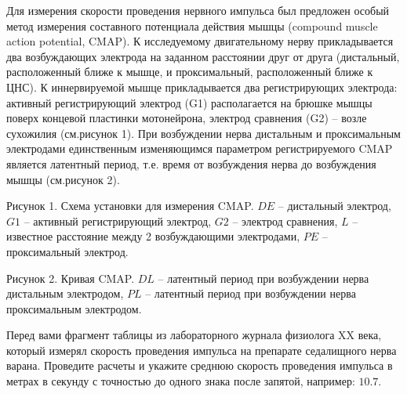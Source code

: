 
Для
измерения скорости проведения нервного импульса был предложен особый метод
измерения составного потенциала действия мышцы (compound muscle action
potential, CMAP). К исследуемому
двигательному нерву прикладывается два возбуждающих электрода на заданном
расстоянии друг от друга (дистальный,
расположенный ближе к мышце, и проксимальный,
расположенный ближе к ЦНС). К иннервируемой мышце прикладывается два
регистрирующих электрода: активный
регистрирующий электрод (G1) располагается на брюшке мышцы поверх концевой
пластинки мотонейрона, электрод
сравнения (G2) – возле сухожилия (см.рисунок 1). При возбуждении нерва
дистальным и проксимальным электродами единственным изменяющимся параметром
регистрируемого CMAP является латентный период, т.е. время от возбуждения нерва
до возбуждения мышцы (см.рисунок 2).


Рисунок
1. Схема установки для измерения CMAP. $DE$ – дистальный электрод, $G1$ – активный
регистрирующий электрод, $G2$ – электрод сравнения, $L$ – известное расстояние
между 2 возбуждающими электродами, $PE$ – проксимальный электрод.


Рисунок
2. Кривая CMAP. $DL$  – латентный период при возбуждении нерва дистальным электродом,
$PL$  – латентный период при возбуждении нерва проксимальным электродом.

Перед вами фрагмент таблицы из лабораторного
журнала физиолога XX века, который измерял скорость проведения импульса на
препарате седалищного нерва варана. Проведите расчеты и укажите среднюю
скорость проведения импульса в метрах в секунду с точностью до одного знака
после запятой, например: $10.7$.  


\explanationSection


